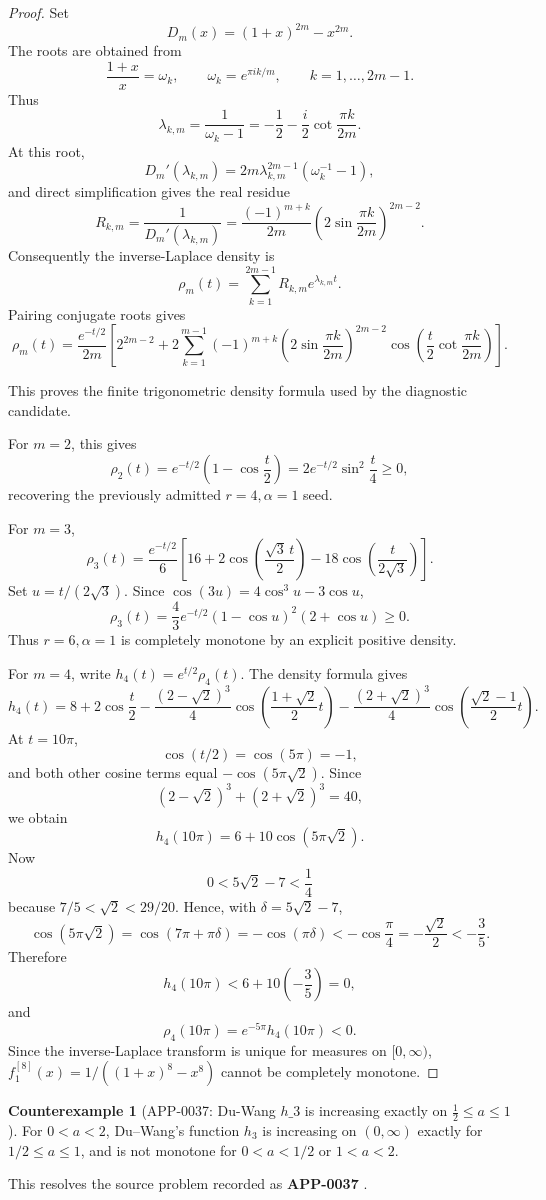 \documentclass[11pt]{article}
\numberwithin{equation}{section}
\theoremstyle{definition}
\newtheorem{counterexample}[theorem]{Counterexample}
\theoremstyle{remark}
\newcommand{\1}{\mathbf 1}
\begin{document}
\begin{proof}
Set
\[
D_m(x)=(1+x)^{2m}-x^{2m}.
\]
The roots are obtained from
\[
\frac{1+x}{x}=\omega_k,\qquad
\omega_k=e^{\pi i k/m},\qquad k=1,\ldots,2m-1.
\]
Thus
\[
\lambda_{k,m}
=\frac{1}{\omega_k-1}
=-\frac12-\frac{i}{2}\cot\frac{\pi k}{2m}.
\]
At this root,
\[
D_m'(\lambda_{k,m})
=2m\lambda_{k,m}^{2m-1}(\omega_k^{-1}-1),
\]
and direct simplification gives the real residue
\[
R_{k,m}
=\frac{1}{D_m'(\lambda_{k,m})}
=\frac{(-1)^{m+k}}{2m}
\left(2\sin\frac{\pi k}{2m}\right)^{2m-2}.
\]
Consequently the inverse-Laplace density is
\[
\rho_m(t)
=\sum_{k=1}^{2m-1}R_{k,m}e^{\lambda_{k,m}t}.
\]
Pairing conjugate roots gives
\[
\rho_m(t)
=\frac{e^{-t/2}}{2m}
\left[
2^{2m-2}
+2\sum_{k=1}^{m-1}
(-1)^{m+k}
\left(2\sin\frac{\pi k}{2m}\right)^{2m-2}
\cos\!\left(
\frac{t}{2}\cot\frac{\pi k}{2m}
\right)
\right].
\]

This proves the finite trigonometric density formula used by the diagnostic
candidate.

For \(m=2\), this gives
\[
\rho_2(t)=e^{-t/2}\left(1-\cos\frac t2\right)
=2e^{-t/2}\sin^2\frac t4\ge0,
\]
recovering the previously admitted \(r=4,\alpha=1\) seed.

For \(m=3\),
\[
\rho_3(t)
=\frac{e^{-t/2}}6
\left[
16+2\cos\left(\frac{\sqrt3\,t}{2}\right)
-18\cos\left(\frac{t}{2\sqrt3}\right)
\right].
\]
Set \(u=t/(2\sqrt3)\).  Since
\(\cos(3u)=4\cos^3u-3\cos u\),
\[
\rho_3(t)
=\frac{4}{3}e^{-t/2}(1-\cos u)^2(2+\cos u)\ge0.
\]
Thus \(r=6,\alpha=1\) is completely monotone by an explicit positive density.

For \(m=4\), write \(h_4(t)=e^{t/2}\rho_4(t)\).  The density formula gives
\[
h_4(t)
=8+2\cos\frac t2
-\frac{(2-\sqrt2)^3}{4}
\cos\left(\frac{1+\sqrt2}{2}t\right)
-\frac{(2+\sqrt2)^3}{4}
\cos\left(\frac{\sqrt2-1}{2}t\right).
\]
At \(t=10\pi\),
\[
\cos(t/2)=\cos(5\pi)=-1,
\]
and both other cosine terms equal \(-\cos(5\pi\sqrt2)\).  Since
\[
(2-\sqrt2)^3+(2+\sqrt2)^3=40,
\]
we obtain
\[
h_4(10\pi)=6+10\cos(5\pi\sqrt2).
\]
Now
\[
0<5\sqrt2-7<\frac14
\]
because \(7/5<\sqrt2<29/20\).  Hence, with
\(\delta=5\sqrt2-7\),
\[
\cos(5\pi\sqrt2)=\cos(7\pi+\pi\delta)=-\cos(\pi\delta)
<-\cos\frac\pi4=-\frac{\sqrt2}{2}<-\frac35.
\]
Therefore
\[
h_4(10\pi)<6+10\left(-\frac35\right)=0,
\]
and
\[
\rho_4(10\pi)=e^{-5\pi}h_4(10\pi)<0.
\]
Since the inverse-Laplace transform is unique for measures on
\([0,\infty)\), \(f^{[8]}_1(x)=1/((1+x)^8-x^8)\) cannot be completely monotone.
\end{proof}

\begin{counterexample}[APP-0037: Du-Wang \(h\_3\) is increasing exactly on \(\frac12\le a\le1\)]
\label{res:du-wang-h3-open-problem-2-classification}
For \(0<a<2\), Du--Wang's function \(h_3\) is increasing on \((0,\infty)\) exactly for \(1/2\le a\le1\), and is not monotone for \(0<a<1/2\) or \(1<a<2\).

This resolves the source problem recorded as \textbf{APP-0037} \cite{du-wang-h3}.
\end{counterexample}
\end{document}
